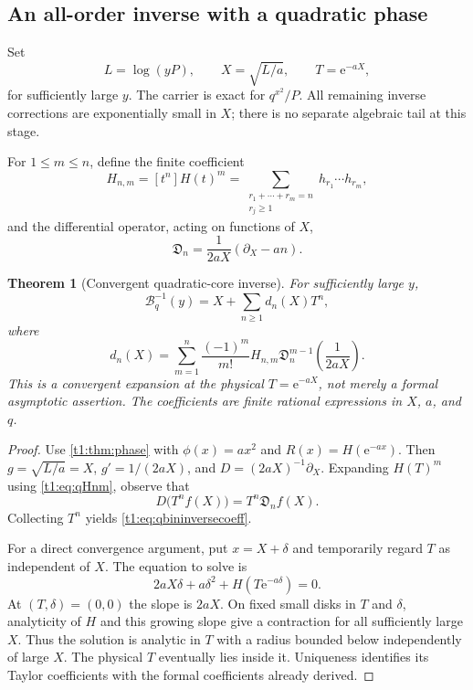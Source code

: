 \documentclass[11pt,openany]{book}
\numberwithin{equation}{chapter}
\theoremstyle{plain}
\newtheorem{theorem}{Theorem}[chapter]
\theoremstyle{definition}
\theoremstyle{remark}
\newcommand{\ee}{\mathrm e}
\newcommand{\coefA}[1]{\left[#1\right]}       %
\begin{document}
\subsection{An all-order inverse with a quadratic phase}
Set
\begin{equation}
 L=\log(yP),\qquad X=\sqrt{L/a},\qquad T=\ee^{-aX},
 \label{t1:eq:qbincore}
\end{equation}
for sufficiently large $y$. The carrier is exact for $q^{x^2}/P$. All remaining inverse corrections are exponentially small in $X$; there is no separate algebraic tail at this stage.

For $1\le m\le n$, define the finite coefficient
\begin{equation}
 H_{n,m}=\coefA{t^n}H(t)^m
 =\sum_{\substack{r_1+\cdots+r_m=n\\r_j\ge1}}h_{r_1}\cdots h_{r_m},
 \label{t1:eq:qHnm}
\end{equation}
and the differential operator, acting on functions of $X$,
\begin{equation}
 \mathfrak D_n=\frac1{2aX}(\partial_X-an).
 \label{t1:eq:qoperator}
\end{equation}

\begin{theorem}[Convergent quadratic-core inverse]
\label{t1:thm:qbininverse}
For sufficiently large $y$,
\begin{equation}
 \mathcal B_q^{-1}(y)=X+\sum_{n\ge1}d_n(X)T^n,
 \label{t1:eq:qbininverse}
\end{equation}
where
\begin{equation}
 d_n(X)=\sum_{m=1}^n\frac{(-1)^m}{m!}H_{n,m}
 \mathfrak D_n^{m-1}\left(\frac1{2aX}\right).
 \label{t1:eq:qbininversecoeff}
\end{equation}
This is a convergent expansion at the physical $T=\ee^{-aX}$, not merely a formal asymptotic assertion. The coefficients are finite rational expressions in $X$, $a$, and $q$.
\end{theorem}
\begin{proof}
Use \cref{t1:thm:phase} with $\phi(x)=ax^2$ and $R(x)=H(\ee^{-ax})$. Then $g=\sqrt{L/a}=X$, $g'=1/(2aX)$, and $D=(2aX)^{-1}\partial_X$. Expanding $H(T)^m$ using \eqref{t1:eq:qHnm}, observe that
\[
 D\bigl(T^n f(X)\bigr)=T^n\mathfrak D_n f(X).
\]
Collecting $T^n$ yields \eqref{t1:eq:qbininversecoeff}.

For a direct convergence argument, put $x=X+\delta$ and temporarily regard $T$ as independent of $X$. The equation to solve is
\[
 2aX\delta+a\delta^2+H(T\ee^{-a\delta})=0.
\]
At $(T,\delta)=(0,0)$ the slope is $2aX$. On fixed small disks in $T$ and $\delta$, analyticity of $H$ and this growing slope give a contraction for all sufficiently large $X$. Thus the solution is analytic in $T$ with a radius bounded below independently of large $X$. The physical $T$ eventually lies inside it. Uniqueness identifies its Taylor coefficients with the formal coefficients already derived.
\end{proof}
\end{document}
